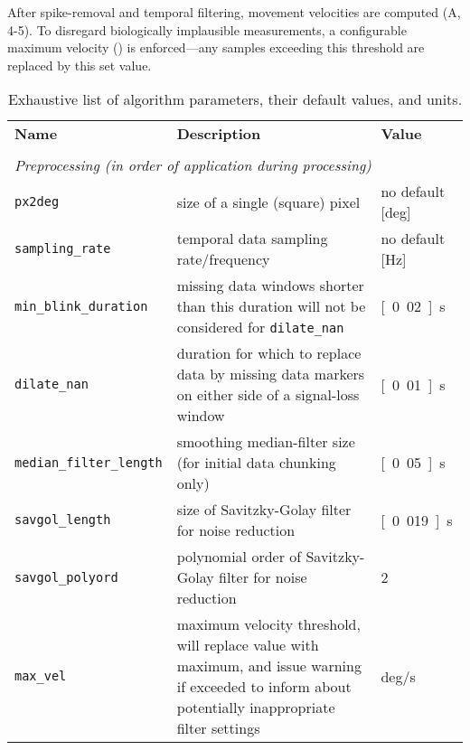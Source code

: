 After spike-removal and temporal filtering, movement velocities are computed
(A, 4-5). To disregard biologically implausible measurements, a
configurable maximum velocity () is enforced---any samples
exceeding this threshold are replaced by this set value.

\begin{table*}[tbp]
  \caption{Exhaustive list of algorithm parameters, their default values, and units.}
  \label{tab:parameters}
  \small
  \begin{tabular}{lp{85mm}l}
    \textbf{Name} & \textbf{Description} & \textbf{Value} \\
    & & \\
    \multicolumn{3}{l}{\textit{Preprocessing (in order of application during processing)}} \\
    \texttt{px2deg} &
    size of a single (square) pixel &
    no default [\unit{deg}]\\
    \texttt{sampling\_rate} &
    temporal data sampling rate/frequency &
    no default [\unit{Hz}]\\
    \texttt{min\_blink\_duration} &
    missing data windows shorter than this duration will not be considered for \texttt{dilate\_nan}&
    \unit[0.02]{s}\\
    \texttt{dilate\_nan} &
    duration for which to replace data by missing data markers on either side of a
    signal-loss window &
    \unit[0.01]{s}\\
    \texttt{median\_filter\_length} &
    smoothing median-filter size (for initial data chunking only) &
    \unit[0.05]{s}\\
    \texttt{savgol\_length} &
    size of Savitzky-Golay filter for noise reduction&
    \unit[0.019]{s}\\
    \texttt{savgol\_polyord} &
    polynomial order of Savitzky-Golay filter for noise reduction&
    2\\
    \texttt{max\_vel} &
    maximum velocity threshold, will replace value with maximum, and issue
    warning if exceeded to inform about
    potentially inappropriate filter settings
    \citep[default value based on ][]{holmqvist2011eye}&
    \unit[1000]{deg/s}\\


\end{tabular}
\end{table*}
